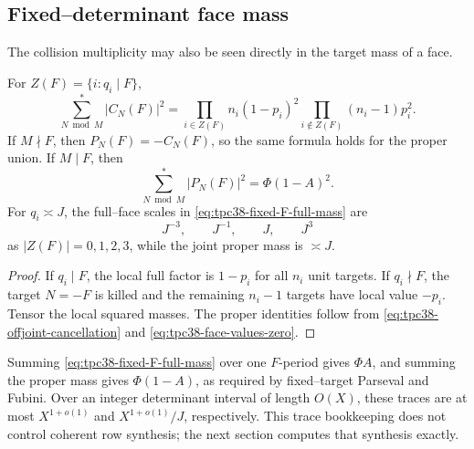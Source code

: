 \subsection{Fixed--determinant face mass}

The collision multiplicity may also be seen directly in the target mass
of a face.

\begin{proposition}
\label{prop:tpc38-fixed-F-face-mass}
For \(Z(F)=\{i:q_i\mid F\}\),
\begin{equation}
 \boxed{
 \sum_{N\bmod M}^{*}|C_N(F)|^2
 =\prod_{i\in Z(F)}n_i(1-p_i)^2
  \prod_{i\notin Z(F)}(n_i-1)p_i^2.}
 \label{eq:tpc38-fixed-F-full-mass}
\end{equation}
If \(M\nmid F\), then \(P_N(F)=-C_N(F)\), so the same formula holds for
the proper union.  If \(M\mid F\), then
\begin{equation}
 \sum_{N\bmod M}^{*}|P_N(F)|^2
 =\Phi(1-A)^2.
 \label{eq:tpc38-fixed-F-proper-joint-mass}
\end{equation}
For \(q_i\asymp J\), the full--face scales in
\eqref{eq:tpc38-fixed-F-full-mass} are
\begin{equation}
 J^{-3},\qquad J^{-1},\qquad J,\qquad J^3
 \label{eq:tpc38-fixed-F-mass-ladder}
\end{equation}
as \(|Z(F)|=0,1,2,3\), while the joint proper mass is \(\asymp J\).
\end{proposition}

\begin{proof}
If \(q_i\mid F\), the local full factor is \(1-p_i\) for all \(n_i\)
unit targets.  If \(q_i\nmid F\), the target \(N=-F\) is killed and the
remaining \(n_i-1\) targets have local value \(-p_i\).  Tensor the local
squared masses.  The proper identities follow from
\eqref{eq:tpc38-offjoint-cancellation} and
\eqref{eq:tpc38-face-values-zero}.
\end{proof}

Summing \eqref{eq:tpc38-fixed-F-full-mass} over one \(F\)-period gives
\(\Phi A\), and summing the proper mass gives \(\Phi(1-A)\), as required by
fixed--target Parseval and Fubini.  Over an integer determinant interval of
length \(O(X)\), these traces are at most \(X^{1+o(1)}\) and
\(X^{1+o(1)}/J\), respectively.  This trace bookkeeping does not control coherent row
synthesis; the next section computes that synthesis exactly.
